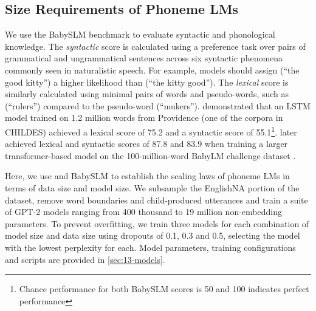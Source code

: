 \subsection{Size Requirements of Phoneme LMs}\label{sec:13-sizerequirements}




We use the BabySLM benchmark \citep{lavechin} to evaluate syntactic and phonological knowledge. The \emph{syntactic} score is calculated using a preference task over pairs of grammatical and ungrammatical sentences across six syntactic phenomena commonly seen in naturalistic speech. For example, models should assign \texttt{} (``the good kitty'') a higher likelihood than \texttt{} (``the kitty good''). The \emph{lexical} score is similarly calculated using minimal pairs of words and pseudo-words, such as \texttt{} (``rulers'') compared to the pseudo-word \texttt{} (``mukers''). \citet{lavechin} demonstrated that an LSTM model trained on 1.2 million words from Providence (one of the corpora in CHILDES) achieved a lexical score of 75.2 and a syntactic score of 55.1\footnote{Chance performance for both BabySLM scores is 50 and 100 indicates perfect performance}. \citet{goriely2024babble} later achieved lexical and syntactic scores of 87.8 and 83.9 when training a larger transformer-based model on the 100-million-word BabyLM challenge dataset \citep{conll-2024-babylm}.

Here, we use \ipachildes and BabySLM to establish the scaling laws of phoneme LMs in terms of data size and model size. We subsample the EnglishNA portion of the dataset, remove word boundaries and child-produced utterances and train a suite of GPT-2 models ranging from 400 thousand to 19 million non-embedding parameters. To prevent overfitting, we train three models for each combination of model size and data size using dropouts of 0.1, 0.3 and 0.5, selecting the model with the lowest perplexity for each. Model parameters, training configurations and scripts are provided in \cref{sec:13-models}.

